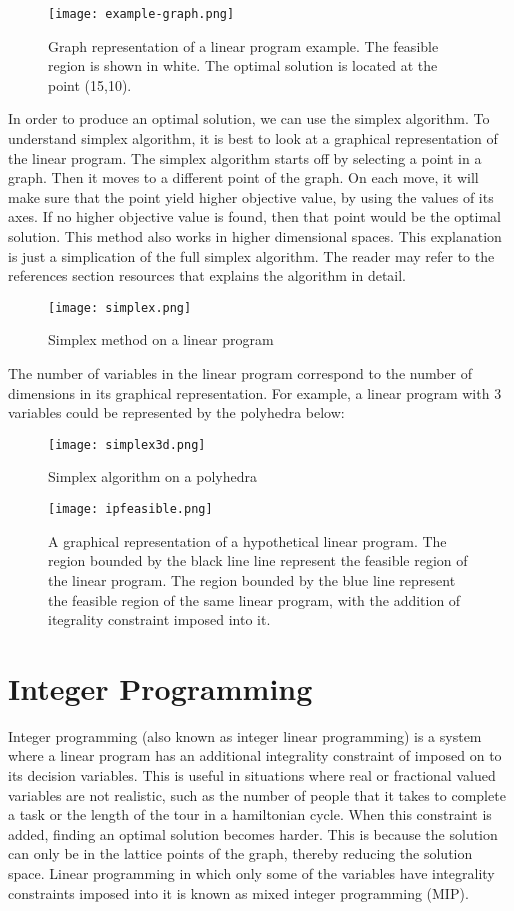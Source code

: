 \begin{figure}[!ht]
  \centering
    \texttt{[image: example-graph.png]}
    \caption{Graph representation of a linear program example. The feasible region is shown in white. The optimal solution
  is located at the point (15,10).}
\end{figure}
In order to produce an optimal solution, we can use the simplex algorithm. To understand simplex algorithm, it is best to look at
a graphical representation of the linear program. The simplex algorithm starts off by selecting a point in a graph.
Then it moves to a different point of the graph. On each move, it will make sure that the point yield higher
objective value, by using the values of its axes. If no higher objective value is found, then that point would be the
optimal solution. This method also works in higher dimensional spaces. This explanation is just a simplication of the full
simplex algorithm. The reader may refer to the references section resources that explains the algorithm in detail.

\begin{figure}[!ht]
  \centering
    \texttt{[image: simplex.png]}
    \caption{Simplex method on a linear program}
\end{figure}

The number of variables in the linear program correspond to the number of dimensions in its graphical representation. For example,
a linear program with 3 variables could be represented by the polyhedra below:

\begin{figure}[!ht]
  \centering
    \texttt{[image: simplex3d.png]}
    \caption{Simplex algorithm on a polyhedra}
    \vspace{1cm}
    \texttt{[image: ipfeasible.png]}
    \caption{A graphical representation of a hypothetical linear program. The region bounded by the black line
  line represent the feasible region of the linear program. The region bounded by the blue line represent
   the feasible region of the same linear program, with the addition of itegrality constraint imposed into it.}
\end{figure}

\section{Integer Programming}
Integer programming (also known as integer linear programming) is a system where a linear program has an additional
integrality constraint of imposed on to its decision variables. This is useful in situations where real or
fractional valued variables are not realistic, such as the number of people that it takes to complete a task or the
length of the tour in a hamiltonian cycle.
When this constraint is added, finding an optimal solution becomes harder. This is because the solution can only be
in the lattice points of the graph, thereby
reducing the solution space. Linear programming in which only some of the variables have integrality constraints imposed
into it is known as mixed integer programming (MIP).

